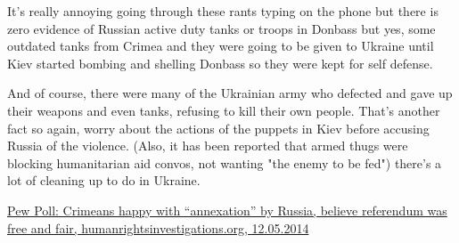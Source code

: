 \begin{itemize}
\begin{itemize}

It's really annoying going through these rants typing on the phone but there is
zero evidence of Russian active duty tanks or troops in Donbass but yes, some
outdated tanks from Crimea and they were going to be given to Ukraine until
Kiev started bombing and shelling Donbass so they were kept for self defense.


And of course, there were many of the Ukrainian army who defected and gave up
their weapons and even tanks, refusing to kill their own people. That's another
fact so again, worry about the actions of the puppets in Kiev before accusing
Russia of the violence.  (Also, it has been reported that armed thugs were
blocking humanitarian aid convos, not wanting "the enemy to be fed") there's a
lot of cleaning up to do in Ukraine.


\href{https://humanrightsinvestigations.org/2014/05/12/pew-poll-crimeans-happy-with-annexation-by-russia-believe-referendum-was-free-and-fair/}{%
Pew Poll: Crimeans happy with \enquote{annexation} by Russia, believe referendum was free and fair, %
humanrightsinvestigations.org, 12.05.2014%
}



\end{itemize}
\end{itemize}
